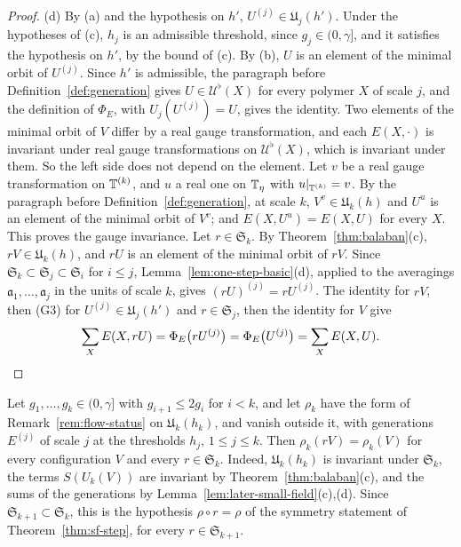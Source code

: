 \begin{proof}
(d) By (a) and the hypothesis on $h'$, $U^{(j)}\in\mathfrak U_j(h')$. Under the hypotheses of (c), $h_j$ is an admissible threshold, since $g_j\in(0,\gamma]$, and it satisfies the hypothesis on $h'$, by the bound of (c). By (b), $U$ is an element of the minimal orbit of $U^{(j)}$. Since $h'$ is admissible, the paragraph before Definition~\ref{def:generation} gives $U\in\mathcal U^\flat(X)$ for every polymer $X$ of scale $j$, and the definition of $\Phi_E$, with $U_j(U^{(j)})=U$, gives the identity. Two elements of the minimal orbit of $V$ differ by a real gauge transformation, and each $E(X,\cdot)$ is invariant under real gauge transformations on $\mathcal U^\flat(X)$, which is invariant under them. So the left side does not depend on the element. Let $v$ be a real gauge transformation on $\mathbb T^{(k)}$, and $u$ a real one on $\mathbb T_\eta$ with $u|_{\mathbb T^{(k)}}=v$. By the paragraph before Definition~\ref{def:generation}, at scale $k$, $V^v\in\mathfrak U_k(h)$ and $U^u$ is an element of the minimal orbit of $V^v$; and $E(X,U^u)=E(X,U)$ for every $X$. This proves the gauge invariance. Let $r\in\mathfrak S_k$. By Theorem~\ref{thm:balaban}(c), $rV\in\mathfrak U_k(h)$, and $rU$ is an element of the minimal orbit of $rV$. Since $\mathfrak S_k\subset\mathfrak S_j\subset\mathfrak S_i$ for $i\le j$, Lemma~\ref{lem:one-step-basic}(d), applied to the averagings $\mathfrak a_1,\dots,\mathfrak a_j$ in the units of scale $k$, gives $(rU)^{(j)}=rU^{(j)}$. The identity for $rV$, then (G3) for $U^{(j)}\in\mathfrak U_j(h')$ and $r\in\mathfrak S_j$, then the identity for $V$ give
\[
\sum_XE(X,rU)=\Phi_E\big(rU^{(j)}\big)=\Phi_E\big(U^{(j)}\big)=\sum_XE(X,U) .\qedhere
\]
\end{proof}

\begin{remark}\label{rem:later-symmetry}
Let $g_1,\dots,g_k\in(0,\gamma]$ with $g_{i+1}\le2g_i$ for $i<k$, and let $\rho_k$ have the form of Remark~\ref{rem:flow-status} on $\mathfrak U_k(h_k)$, and vanish outside it, with generations $E^{(j)}$ of scale $j$ at the thresholds $h_j$, $1\le j\le k$. Then $\rho_k(rV)=\rho_k(V)$ for every configuration $V$ and every $r\in\mathfrak S_k$. Indeed, $\mathfrak U_k(h_k)$ is invariant under $\mathfrak S_k$, the terms $S(U_k(V))$ are invariant by Theorem~\ref{thm:balaban}(c), and the sums of the generations by Lemma~\ref{lem:later-small-field}(c),(d). Since $\mathfrak S_{k+1}\subset\mathfrak S_k$, this is the hypothesis $\rho\circ r=\rho$ of the symmetry statement of Theorem~\ref{thm:sf-step}, for every $r\in\mathfrak S_{k+1}$.
\end{remark}

